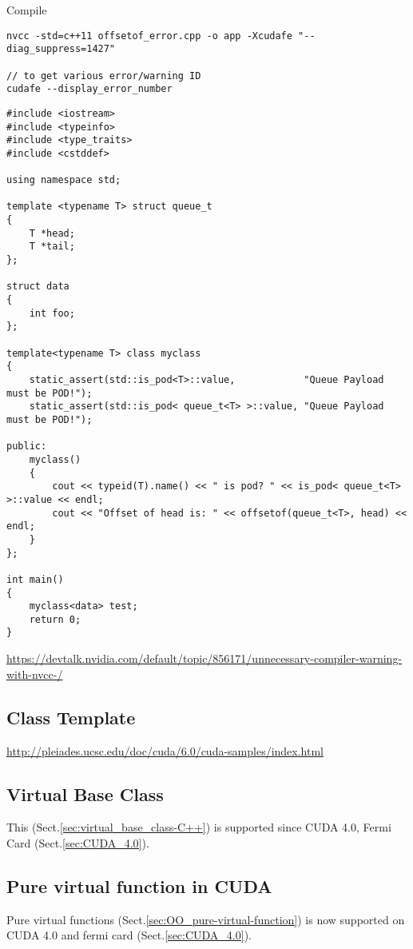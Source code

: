 Compile
\begin{verbatim}
nvcc -std=c++11 offsetof_error.cpp -o app -Xcudafe "--diag_suppress=1427"

// to get various error/warning ID
cudafe --display_error_number
\end{verbatim}

\begin{lstlisting}
#include <iostream>
#include <typeinfo>
#include <type_traits>
#include <cstddef>

using namespace std;

template <typename T> struct queue_t
{
    T *head;
    T *tail;
};

struct data
{
    int foo;
};

template<typename T> class myclass
{
    static_assert(std::is_pod<T>::value,            "Queue Payload must be POD!");
    static_assert(std::is_pod< queue_t<T> >::value, "Queue Payload must be POD!");

public:
    myclass()
    {
        cout << typeid(T).name() << " is pod? " << is_pod< queue_t<T> >::value << endl;
        cout << "Offset of head is: " << offsetof(queue_t<T>, head) << endl;
    }
};

int main()
{
    myclass<data> test;
    return 0;
}
\end{lstlisting}
\url{https://devtalk.nvidia.com/default/topic/856171/unnecessary-compiler-warning-with-nvcc-/}


\subsection{Class Template}

\url{http://pleiades.ucsc.edu/doc/cuda/6.0/cuda-samples/index.html}

\subsection{Virtual Base Class}

This (Sect.\ref{sec:virtual_base_class-C++}) is supported since CUDA 4.0, Fermi
Card (Sect.\ref{sec:CUDA_4.0}).


\subsection{Pure virtual function in CUDA}

Pure virtual functions (Sect.\ref{sec:OO_pure-virtual-function}) is now
supported on CUDA 4.0 and fermi card (Sect.\ref{sec:CUDA_4.0}).


